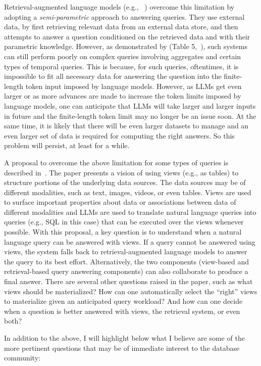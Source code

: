 \documentclass[11pt,dvipdfm]{article}
\begin{document}
Retrieval-augmented language models (e.g., ~\cite{guu-etal-realm, izacard_few-shot_2022, yasunaga2022retrievalaugmented}) overcome this limitation by adopting a {\em semi-parametric} approach to answering queries. They use external data, by first
retrieving relevant data from an external data store, 
and then attempts to answer a question conditioned on the retrieved data and with their parametric knowledge. However, as demonstrated by (Table 5,~\cite{timelineqa}), such systems can still perform poorly on complex queries involving aggregates and certain types of temporal queries. This is because, for such queries, oftentimes, it is impossible to fit all necessary data for answering the question into the finite-length token input imposed by language models. 
However, as LLMs get even larger or as more advances are made to increase the token limits imposed by language models, one can anticipate that LLMs will take larger and larger inputs in future and the finite-length token limit may no longer be an issue soon. At the same time, it is likely that there will be even larger datasets to manage and an even larger set of data is required for computing the right answers. So this problem will persist, at least for a while.

A proposal to overcome the above limitation for some types of queries is described in~\cite{posttext}. The paper presents a vision of using views (e.g., as tables) to structure portions of the underlying data sources. The data sources may be of different modalities, such as text, images, videos, or even tables. Views are used to surface important properties about data or associations between data of different modalities and LLMs are used to translate natural language queries into queries (e.g., SQL in this case) that can be executed over the views whenever possible. With this proposal, a key question is to understand when a natural language query can be answered with views. If a query cannot be answered using views, the system falls back to retrieval-augmented language models to answer the query to its best effort. Alternatively, the two components (view-based and retrieval-based query answering components) can also collaborate to produce a final answer. There are several other questions raised in the paper, such as what views should be materialized? How can one automatically select the ``right'' views to materialize given an anticipated query workload? And how can one decide when a question is better answered with views, the retrieval system, or even both?

In addition to the above, I will highlight below what I believe are some of the more pertinent questions that may be of immediate interest to the database community:
\end{document}
